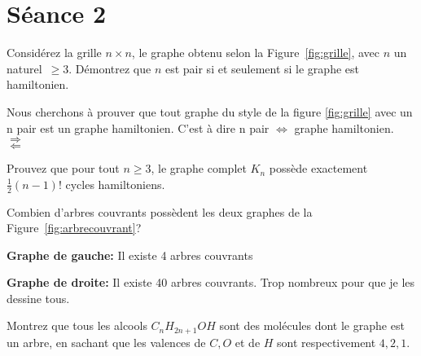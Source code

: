 
\section{Séance 2}

\begin{exo}
Consid\'erez la grille $n \times n$, le graphe obtenu selon la Figure~\ref{fig:grille}, avec $n$ un naturel~$\geq 3$.
D\'emontrez que $n$ est pair si et seulement si le graphe est hamiltonien.
\end{exo}



Nous cherchons à prouver que tout graphe du style de la figure \ref{fig:grille} avec un n pair est un graphe hamiltonien. C'est à dire n pair $\Leftrightarrow$ graphe hamiltonien. \\

$\Rightarrow$ \\

$\Leftarrow$ \\


\begin{exo}
Prouvez que pour tout $n \geq 3$, le graphe complet $K_n$ poss\`ede exactement $\frac{1}{2}(n-1)!$ cycles hamiltoniens.
\end{exo}


\begin{exo}
Combien d'arbres couvrants poss\`edent les deux graphes de la Figure~\ref{fig:arbrecouvrant}?
\end{exo}



\textbf{Graphe de gauche:} Il existe 4 arbres couvrants\\

\begin{figure}[!h]
\centering
\scalebox{.825}{}
\end{figure}

\textbf{Graphe de droite:} Il existe 40 arbres couvrants. Trop nombreux pour que je les dessine tous.\\



\begin{exo}
Montrez que tous les alcools $C_nH_{2n+1}OH$ sont des mol\'ecules dont le graphe est un arbre, en sachant que les valences de $C, O$ et de $H$ sont respectivement $4, 2, 1$.
\end{exo}

